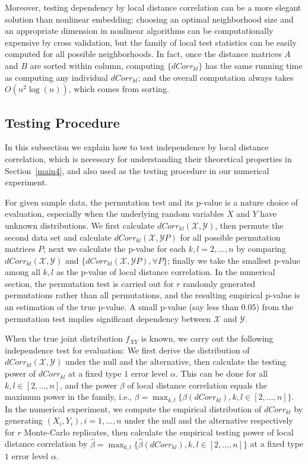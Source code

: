 \documentclass[12pt]{article}
\begin{document}
Moreover, testing dependency by local distance correlation can be a more elegant solution than nonlinear embedding: choosing an optimal neighborhood size and an appropriate dimension in nonlinear algorithms can be computationally expensive by cross validation, but the family of local test statistics can be easily computed for all possible neighborhoods. In fact, once the distance matrices $A$ and $B$ are sorted within column, computing $\{dCorr_{kl}\}$ has the same running time as computing any individual $dCorr_{kl}$; and the overall computation always takes $O(n^2 \log(n))$, which comes from sorting. 

\subsection{Testing Procedure}
\label{main3}
In this subsection we explain how to test independence by local distance correlation, which is necessary for understanding their theoretical properties in Section~\ref{main4}, and also used as the testing procedure in our numerical experiment.

For given sample data, the permutation test and its p-value is a nature choice of evaluation, especially when the underlying random variables $X$ and $Y$ have unknown distributions. We first calculate $dCorr_{kl}(\mathcal{X},\mathcal{Y})$, then permute the second data set and calculate $dCorr_{kl}(\mathcal{X},\mathcal{Y}P)$ for all possible permutation matrices $P$; next we calculate the p-value for each $k,l=2,\ldots,n$ by comparing $dCorr_{kl}(\mathcal{X},\mathcal{Y})$ and $\{dCorr_{kl}(\mathcal{X},\mathcal{Y}P), \forall P\}$; finally we take the smallest p-value among all $k,l$ as the p-value of local distance correlation. In the numerical section, the permutation test is carried out for $r$ randomly generated permutations rather than all permutations, and the resulting empirical p-value is an estimation of the true p-value. A small p-value (say less than $0.05$) from the permutation test implies significant dependency between $\mathcal{X}$ and $\mathcal{Y}$.

When the true joint distribution $f_{XY}$ is known, we carry out the following independence test for evaluation: We first derive the distribution of $dCorr_{kl}(\mathcal{X}, \mathcal{Y})$ under the null and the alternative, then calculate the testing power of $dCorr_{kl}$ at a fixed type $1$ error level $\alpha$. This can be done for all $k,l\in [2,\ldots,n]$, and the power $\beta$ of local distance correlation equals the maximum power in the family, i.e., $\beta=\max_{k,l}\{\beta(dCorr_{kl}), k,l\in [2,\ldots,n]\}$. In the numerical experiment, we compute the empirical distribution of $dCorr_{kl}$ by generating $(X_{i},Y_{i}), i=1,\ldots,n$ under the null and the alternative respectively for $r$ Monte-Carlo replicates, then calculate the empirical testing power of local distance correlation by $\hat{\beta}=\max_{k,l}\{\hat{\beta}(dCorr_{kl}), k,l\in [2,\ldots,n]\}$ at a fixed type $1$ error level $\alpha$. 
\end{document}
